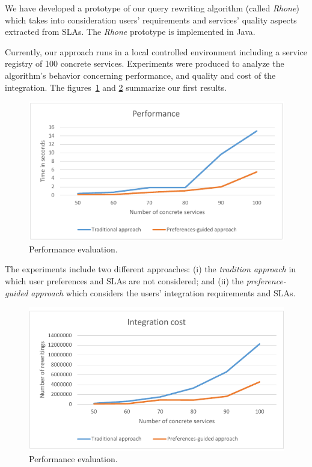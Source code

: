 We have developed a prototype of our query rewriting algorithm (called \textit{Rhone}) which takes into consideration users' requirements and services' quality aspects extracted from SLAs. The \textit{Rhone} prototype is implemented in Java.

Currently, our approach runs in a local controlled environment including a service registry of 100 concrete services. 
Experiments were produced to analyze the algorithm's behavior concerning performance, and quality and cost of the integration. The figures~\ref{fig01} and \ref{fig02} summarize our first results.

\begin{figure}[!h]
\centering
\includegraphics[scale=0.8]{fig1.pdf}
\caption{Performance evaluation.}\label{fig01}
\end{figure} 

The experiments include two different approaches: (i) the \textit{tradition approach} in which user preferences and SLAs are not considered; and (ii) the \textit{preference-guided approach} which considers the users' integration requirements and SLAs.

\begin{figure}[!h]
\centering
\includegraphics[scale=0.8]{fig2.pdf}
\caption{Performance evaluation.}\label{fig02}
\end{figure} 

